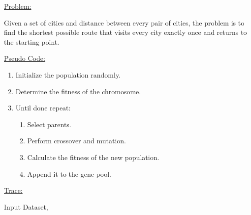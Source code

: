 \documentclass[12pt]{article}
\renewcommand{\_}{\kern-1.5pt\textunderscore\kern-1.5pt}
\begin{document}
\vspace{\baselineskip}
{\fontsize{14pt}{16.8pt}\selectfont \uline{Problem:}\par}\par

Given a set of cities and distance between every pair of cities, the problem is to find the shortest possible route that visits every city exactly once and returns to the starting point.\par


\vspace{\baselineskip}
{\fontsize{14pt}{16.8pt}\selectfont \uline{Pseudo Code:}\par}\par

\begin{enumerate}
	\item Initialize the population randomly.\par

	\item Determine the fitness of the chromosome.\par

	\item Until done repeat: \par

\begin{enumerate}
	\item Select parents.\par

	\item Perform crossover and mutation.\par

	\item Calculate the fitness of the new population.\par

	\item Append it to the gene pool.
\end{enumerate}
\end{enumerate}\par

{\fontsize{14pt}{16.8pt}\selectfont \uline{Trace:}\par}\par

Input Dataset, \par



\end{document}
